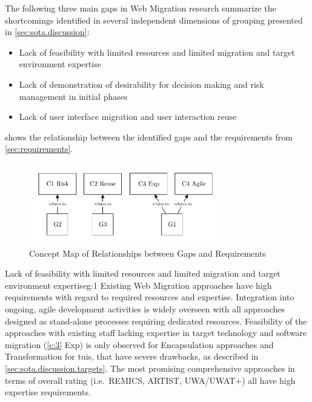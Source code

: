 The following three main gaps in \gls{Web Migration} research summarize the shortcomings identified in several independent dimensions of grouping presented in \cref{sec:sota.discussion}:
\begin{itemize}
\item[\textbf{\cref{g:1}}] Lack of feasibility with limited resources and limited migration and target environment expertise
\item[\textbf{\cref{g:2}}] Lack of demonstration of desirability for decision making and risk management in initial phases 
\item[\textbf{\cref{g:3}}] Lack of user interface migration and user interaction reuse
\end{itemize}

 shows the relationship between the identified gaps and the requirements from \cref{sec:requirements}.

\begin{figure}[hbt]
\hypertarget{fig:req-gaps}{%
\centering%
\includegraphics[width=0.75\textwidth]{../figures/req-gaps.pdf}%
\caption{Concept Map of Relationships between Gaps and Requirements}%
\label{fig:req-gaps}%
}
\end{figure}

\begin{gap}{Lack of feasibility with limited resources and limited migration and target environment expertise}{g:1}
Existing \gls{Web Migration} approaches have high requirements with regard to required resources and expertise.
Integration into ongoing, agile development activities is widely overseen with all approaches designed as stand-alone processes requiring dedicated resources.
Feasibility of the approaches with existing staff lacking expertise in target technology and software migration (\cref{c:3} Exp) is only observed for \gls{Encapsulation} approaches and \gls{Transformation} for \glspl{tui}, that have severe drawbacks, as described in \cref{sec:sota.discussion.targets}.
The most promising comprehensive approaches in terms of overall rating (i.e.~REMICS, ARTIST, UWA/UWAT+) all have high expertise requirements.
\end{gap}

